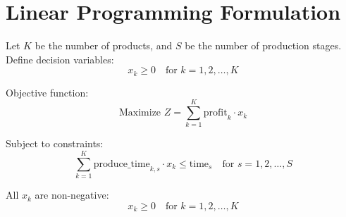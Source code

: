 \documentclass{article}
\begin{document}
\section*{Linear Programming Formulation}

Let \( K \) be the number of products, and \( S \) be the number of production stages.
Define decision variables:
\[
x_k \geq 0 \quad \text{for } k = 1, 2, \ldots, K
\]

Objective function:
\[
\text{Maximize } Z = \sum_{k=1}^{K} \text{profit}_k \cdot x_k
\]

Subject to constraints:
\[
\sum_{k=1}^{K} \text{produce\_time}_{k, s} \cdot x_k \leq \text{time}_s \quad \text{for } s = 1, 2, \ldots, S
\]

All \( x_k \) are non-negative:
\[
x_k \geq 0 \quad \text{for } k = 1, 2, \ldots, K
\]
\end{document}
